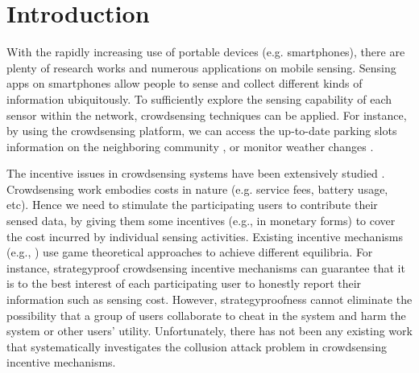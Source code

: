 \documentclass[conference]{IEEEtran}
\theoremstyle{definition}
\begin{document}
\section{Introduction}
With the rapidly increasing use of portable devices (e.g. smartphones), there are plenty of research works \cite{ganti2011mobile, vukovic2010ubiquitous, cortes2002coverage} and numerous applications \cite{nawaz2013parksense, rai2012zee, yan2011crowdpark, kazman2009metropolis} on mobile sensing. Sensing apps on smartphones allow people to sense and collect different kinds of information ubiquitously. 
To sufficiently explore the sensing capability of each sensor within the network, crowdsensing \cite{howe2006rise} \cite{ganti2011mobile} techniques can be applied. For instance, by using the  crowdsensing platform, we can access the up-to-date parking slots information on the neighboring community \cite{nawaz2013parksense, yan2011crowdpark}, or monitor weather changes \cite{kazman2009metropolis}.

The incentive issues in crowdsensing systems have been extensively studied \cite{yang2012crowdsourcing, zhang2012reputation, koutsopoulos2013optimal, singla2013truthful, jaimes2012location}. Crowdsensing work embodies costs in nature (e.g. service fees, battery usage, etc). Hence we need to stimulate the participating users to contribute their sensed data,  by giving them some incentives (e.g., in monetary forms) to cover the cost incurred by individual sensing activities. Existing incentive mechanisms (e.g., \cite{yang2012crowdsourcing, zhang2012reputation, jaimes2012location}) use game theoretical approaches to achieve different equilibria. For instance, strategyproof crowdsensing incentive mechanisms\cite{moulin2001strategyproof, chen2013sparc, feng2013imac} can guarantee that it is to the best interest of each participating user to honestly report their information such as sensing cost. However, strategyproofness cannot eliminate the possibility that a group of users collaborate to cheat in the system and harm the system or other users' utility. 
Unfortunately, there has not been any existing work that systematically investigates the collusion attack problem in crowdsensing incentive mechanisms.
\end{document}
